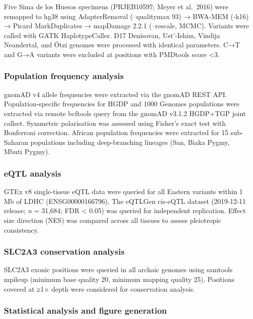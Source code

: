 \documentclass[
  letterpaper,
  DIV=11,
  numbers=noendperiod]{scrartcl}
\begin{document}
Five Sima de los Huesos specimens (PRJEB10597; Meyer et al.~2016) were
remapped to hg38 using AdapterRemoval (--qualitymax 93) → BWA-MEM (-k16)
→ Picard MarkDuplicates → mapDamage 2.2.1 (--rescale, MCMC). Variants
were called with GATK HaplotypeCaller. D17 Denisovan, Ust'-Ishim,
Vindija Neandertal, and Ötzi genomes were processed with identical
parameters. C→T and G→A variants were excluded at positions with
PMDtools score \textless3.

\subsubsection{Population frequency
analysis}\label{population-frequency-analysis}

gnomAD v4 allele frequencies were extracted via the gnomAD REST API.
Population-specific frequencies for HGDP and 1000 Genomes populations
were extracted via remote bcftools query from the gnomAD v3.1.2 HGDP+TGP
joint callset. Symmetric polarisation was assessed using Fisher's exact
test with Bonferroni correction. African population frequencies were
extracted for 15 sub-Saharan populations including deep-branching
lineages (San, Biaka Pygmy, Mbuti Pygmy).

\subsubsection{eQTL analysis}\label{eqtl-analysis}

GTEx v8 single-tissue eQTL data were queried for all Eastern variants
within 1 Mb of LDHC (ENSG00000166796). The eQTLGen cis-eQTL dataset
(2019-12-11 release; \emph{n} = 31,684; FDR \textless{} 0.05) was
queried for independent replication. Effect size direction (NES) was
compared across all tissues to assess pleiotropic consistency.

\subsubsection{SLC2A3 conservation
analysis}\label{slc2a3-conservation-analysis}

SLC2A3 exonic positions were queried in all archaic genomes using
samtools mpileup (minimum base quality 20, minimum mapping quality 25).
Positions covered at ≥1× depth were considered for conservation
analysis.

\subsubsection{Statistical analysis and figure
generation}\label{statistical-analysis-and-figure-generation}
\end{document}
